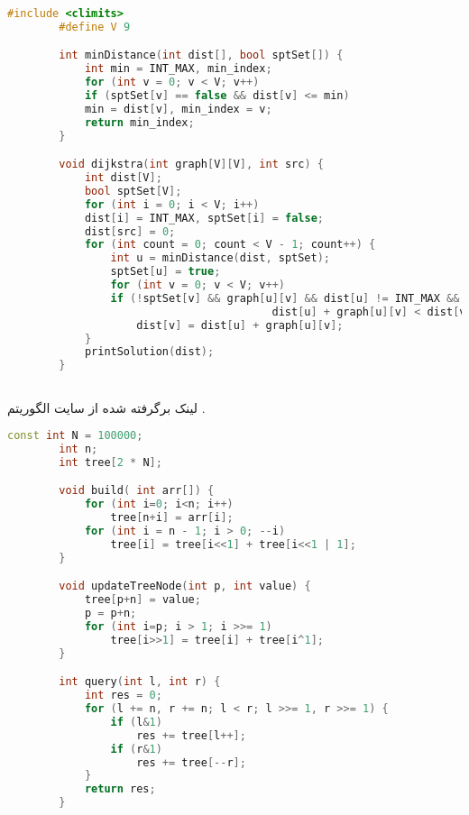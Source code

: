 \documentclass[a4paper,12pt]{report}
\begin{document}
	\begin{latin}
		\small
		\begin{lstlisting}[language=C++]
		#include <climits>
		#define V 9

		int minDistance(int dist[], bool sptSet[]) {
			int min = INT_MAX, min_index;
			for (int v = 0; v < V; v++)
			if (sptSet[v] == false && dist[v] <= min)
			min = dist[v], min_index = v;
			return min_index;
		}

		void dijkstra(int graph[V][V], int src) {
			int dist[V];
			bool sptSet[V];
			for (int i = 0; i < V; i++)
			dist[i] = INT_MAX, sptSet[i] = false;
			dist[src] = 0;
			for (int count = 0; count < V - 1; count++) {
				int u = minDistance(dist, sptSet);
				sptSet[u] = true;
				for (int v = 0; v < V; v++)
				if (!sptSet[v] && graph[u][v] && dist[u] != INT_MAX &&
										 dist[u] + graph[u][v] < dist[v])
					dist[v] = dist[u] + graph[u][v];
			}
			printSolution(dist);
		}
		\end{lstlisting}
	\end{latin}

	\subsection{}\label{subsec2:sec1:chap1}

	لینک برگرفته شده از سایت
	\hyperref{https://www.geeksforgeeks.org}{algorithmSite}{geeksforgeeks}{}
	الگوریتم
	\hyperref{https://www.geeksforgeeks.org/segment-tree-efficient-implementation/}{Segment tree}{geeksforgeeks}
	{}.
	\cite{Geeksfor41:online}
	\begin{latin}
		\small
		\begin{lstlisting}[language=C++]
		const int N = 100000;
		int n;
		int tree[2 * N];

		void build( int arr[]) {
			for (int i=0; i<n; i++)
				tree[n+i] = arr[i];
			for (int i = n - 1; i > 0; --i)
				tree[i] = tree[i<<1] + tree[i<<1 | 1];
		}

		void updateTreeNode(int p, int value) {
			tree[p+n] = value;
			p = p+n;
			for (int i=p; i > 1; i >>= 1)
				tree[i>>1] = tree[i] + tree[i^1];
		}

		int query(int l, int r) {
			int res = 0;
			for (l += n, r += n; l < r; l >>= 1, r >>= 1) {
				if (l&1)
					res += tree[l++];
				if (r&1)
					res += tree[--r];
			}
			return res;
		}
		\end{lstlisting}
	\end{latin}
\end{document}
